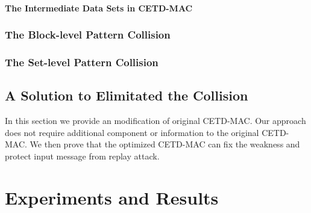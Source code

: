 \documentclass{article}
\begin{document}
\paragraph{The Intermediate Data Sets in CETD-MAC}
\subsubsection{The Block-level Pattern Collision}
\subsubsection{The Set-level Pattern Collision}

\subsection{A Solution to Elimitated the Collision}
In this section we provide an modification of original CETD-MAC. Our approach does not require additional component or information to the original CETD-MAC. We then prove that the optimized CETD-MAC can fix the weakness and protect input message from replay attack.

\section{Experiments and Results}
\end{document}
